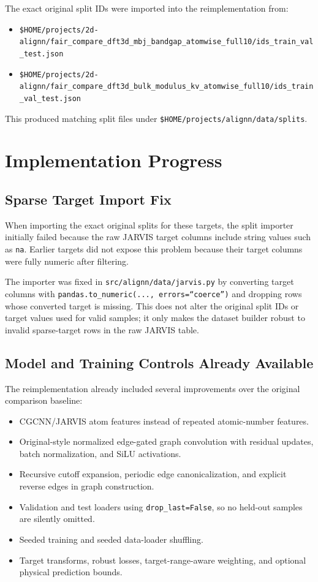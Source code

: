 \documentclass[11pt]{article}
\begin{document}
The exact original split IDs were imported into the reimplementation from:
\begin{itemize}
  \item \texttt{\$HOME/projects/2d-alignn/fair\_compare\_dft3d\_mbj\_bandgap\_atomwise\_full10/ids\_train\_val\_test.json}
  \item \texttt{\$HOME/projects/2d-alignn/fair\_compare\_dft3d\_bulk\_modulus\_kv\_atomwise\_full10/ids\_train\_val\_test.json}
\end{itemize}

This produced matching split files under \texttt{\$HOME/projects/alignn/data/splits}.

\section{Implementation Progress}

\subsection{Sparse Target Import Fix}

When importing the exact original splits for these targets, the split importer initially failed because the raw JARVIS target columns include string values such as \texttt{na}.  Earlier targets did not expose this problem because their target columns were fully numeric after filtering.

The importer was fixed in \texttt{src/alignn/data/jarvis.py} by converting target columns with \texttt{pandas.to\_numeric(..., errors=``coerce'')} and dropping rows whose converted target is missing.  This does not alter the original split IDs or target values used for valid samples; it only makes the dataset builder robust to invalid sparse-target rows in the raw JARVIS table.

\subsection{Model and Training Controls Already Available}

The reimplementation already included several improvements over the original comparison baseline:
\begin{itemize}
  \item CGCNN/JARVIS atom features instead of repeated atomic-number features.
  \item Original-style normalized edge-gated graph convolution with residual updates, batch normalization, and SiLU activations.
  \item Recursive cutoff expansion, periodic edge canonicalization, and explicit reverse edges in graph construction.
  \item Validation and test loaders using \texttt{drop\_last=False}, so no held-out samples are silently omitted.
  \item Seeded training and seeded data-loader shuffling.
  \item Target transforms, robust losses, target-range-aware weighting, and optional physical prediction bounds.
\end{itemize}
\end{document}
